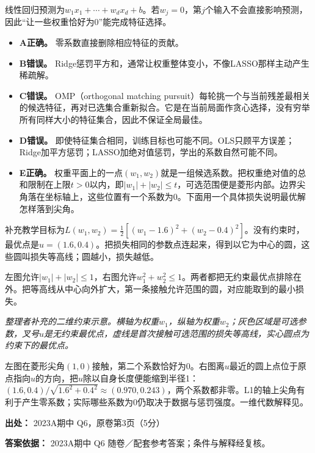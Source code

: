 线性回归预测为\(w_1x_1+\cdots+w_dx_d+b\)。若\(w_j=0\)，第\(j\)个输入不会直接影响预测，因此“让一些权重恰好为0”能完成特征选择。



\begin{itemize}

\item \textbf{A正确。} 零系数直接删除相应特征的贡献。

\item \textbf{B错误。} Ridge惩罚平方和，通常让权重整体变小，不像LASSO那样主动产生稀疏解。

\item \textbf{C错误。} OMP（orthogonal matching pursuit）每轮挑一个与当前残差最相关的候选特征，再对已选集合重新拟合。它是在当前局面作贪心选择，没有穷举所有同样大小的特征集合，因此不保证全局最佳。

\item \textbf{D错误。} 即使特征集合相同，训练目标也可能不同。OLS只顾平方误差；Ridge加平方惩罚；LASSO加绝对值惩罚，学出的系数自然可能不同。

\item \textbf{E正确。} 权重平面上的一点\((w_1,w_2)\)就是一组候选系数。把权重绝对值的总和限制在上限\(t>0\)以内，即\(|w_1|+|w_2|\le t\)，可选范围便是菱形内部。边界尖角落在坐标轴上，这些位置有一个系数为0。下面用一个具体损失说明最优解怎样落到尖角。

\end{itemize}


补充教学目标为\(L(w_1,w_2)=\frac12[(w_1-1.6)^2+(w_2-0.4)^2]\)。没有约束时，最优点是\(u=(1.6,0.4)\)。把损失相同的参数点连起来，得到以它为中心的圆，这些圆叫损失等高线；圆越小，损失越低。


左图允许\(|w_1|+|w_2|\le1\)，右图允许\(w_1^2+w_2^2\le1\)。两者都把无约束最优点排除在外。把等高线从中心向外扩大，第一条接触允许范围的圆，对应能取到的最小损失。




\emph{整理者补充的二维约束示意。横轴为权重\(w_1\)，纵轴为权重\(w_2\)；灰色区域是可选参数，叉号\(u\)是无约束最优点，虚线是首次接触可选范围的损失等高线，实心圆点为约束下的最优点。}


左图在菱形尖角\((1,0)\)接触，第二个系数恰好为0。右图离\(u\)最近的圆上点位于原点指向\(u\)的方向，把\(u\)除以自身长度便能缩到半径1：\((1.6,0.4)/\sqrt{1.6^2+0.4^2}\approx(0.970,0.243)\)，两个系数都非零。L1的轴上尖角有利于产生零系数；实际哪些系数为0仍取决于数据与惩罚强度。一维代数解释见。


\textbf{出处：} 2023A期中 Q6，原卷第3页（5分）


\textbf{答案依据：} 2023A期中 Q6 随卷／配套参考答案；条件与解释经复核。

